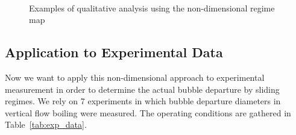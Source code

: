 \begin{figure}[h!]
\centering
{}
\\
\caption{Examples of qualitative analysis using the non-dimensional regime map}
\end{figure}






\subsection{Application to Experimental Data}\label{subsec:data_map}

Now we want to apply this non-dimensional approach to experimental measurement in order to determine the actual bubble departure by sliding regimes. We rely on 7 experiments in which bubble departure diameters in vertical flow boiling were measured. The operating conditions are gathered in Table~\ref{tab:exp_data}.




